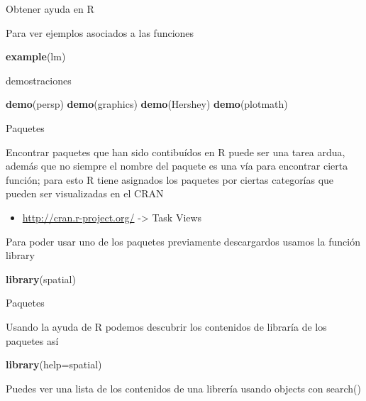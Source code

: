 \documentclass[ignorenonframetext,]{beamer}
\newenvironment{Shaded}{\begin{snugshade}}{\end{snugshade}}
\newcommand{\KeywordTok}[1]{\textcolor[rgb]{0.13,0.29,0.53}{\textbf{#1}}}
\newcommand{\StringTok}[1]{\textcolor[rgb]{0.31,0.60,0.02}{#1}}
\newcommand{\NormalTok}[1]{#1}
\providecommand{\tightlist}{%
  \setlength{\itemsep}{0pt}\setlength{\parskip}{0pt}}
\begin{document}
\begin{frame}[fragile]{Obtener ayuda en R}

Para ver ejemplos asociados a las funciones

\begin{Shaded}
\begin{Highlighting}[]
\KeywordTok{example}\NormalTok{(}\StringTok{lm}\NormalTok{)}
\end{Highlighting}
\end{Shaded}

demostraciones

\begin{Shaded}
\begin{Highlighting}[]
\KeywordTok{demo}\NormalTok{(}\StringTok{persp}\NormalTok{)}
\KeywordTok{demo}\NormalTok{(}\StringTok{graphics}\NormalTok{)}
\KeywordTok{demo}\NormalTok{(}\StringTok{Hershey}\NormalTok{)}
\KeywordTok{demo}\NormalTok{(}\StringTok{plotmath}\NormalTok{)}
\end{Highlighting}
\end{Shaded}

\end{frame}

\begin{frame}[fragile]{Paquetes}

Encontrar paquetes que han sido contibuídos en R puede ser una tarea
ardua, además que no siempre el nombre del paquete es una vía para
encontrar cierta función; para esto R tiene asignados los paquetes por
ciertas categorías que pueden ser visualizadas en el CRAN

\begin{itemize}
\tightlist
\item
  \url{http://cran.r-project.org/} -\textgreater{} Task Views
\end{itemize}

Para poder usar uno de los paquetes previamente descargardos usamos la
función library

\begin{Shaded}
\begin{Highlighting}[]
\KeywordTok{library}\NormalTok{(spatial)}
\end{Highlighting}
\end{Shaded}

\end{frame}

\begin{frame}[fragile]{Paquetes}

Usando la ayuda de R podemos descubrir los contenidos de libraría de los
paquetes así

\begin{Shaded}
\begin{Highlighting}[]
\KeywordTok{library}\NormalTok{(}\StringTok{help=spatial}\NormalTok{)}
\end{Highlighting}
\end{Shaded}

Puedes ver una lista de los contenidos de una librería usando objects
con search()

\end{frame}
\end{document}
